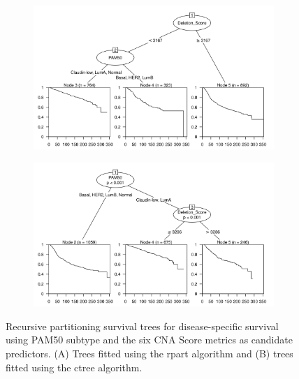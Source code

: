 \begin{figure}[!h]
\centering

\vspace{0.5cm}

\begin{subfigure}{\textwidth}
\subcaption{}
\includegraphics[width=1\textwidth]{../figures/Chapter_3/PartyKit_Survival_Score_DSS_PAM50.png}
\end{subfigure}

\vspace{2cm}

\begin{subfigure}{\textwidth}
\subcaption{}
\includegraphics[width=1\textwidth]{../figures/Chapter_3/Ctree_Survival_Score_DSS_PAM50.png}
\end{subfigure}

\vspace{0.5cm}

\caption[Recursive partitioning survival trees for disease-specific survival using PAM50 subtype and the six CNA Score metrics as candidate predictors.]{Recursive partitioning survival trees for disease-specific survival using PAM50 subtype and the six CNA Score metrics as candidate predictors. (A) Trees fitted using the rpart algorithm and (B) trees fitted using the ctree algorithm.}
\label{fig:PAM50_CNA_Score_DSS}
\end{figure}

